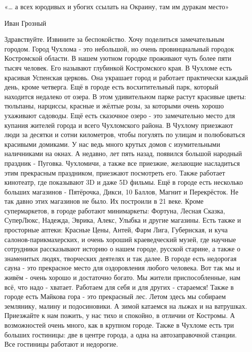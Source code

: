 \begin{itemize}
«… а всех юродивых и убогих ссылать на Окраину, там им дуракам место»

Иван Грозный


Здравствуйте. Извините за беспокойство. Хочу поделиться замечательным городом.
Город Чухлома - это небольшой, но очень провинциальный городок Костромской
области. В нашем уютном городке проживают чуть более пяти тысяч человек. Его
называют глубинкой Костромского края. В Чухломе есть красивая Успенская
церковь. Она украшает город и работает практически каждый день, кроме четверга.
Ещё в городе есть восхитительный парк, который находится недалеко от озера. В
этом удивительном парке растут красивые цветы: тюльпаны, нарциссы, красные и
жёлтые розы, за которыми очень хорошо ухаживают садоводы. Ещё есть сказочное
озеро - это замечательно место для купания жителей города и всего Чухломского
района. В Чухлому приезжают люди за десятки и сотни километров, чтобы погулять
по улицам и полюбоваться красивыми домиками. У нас ведь много крутых домов с
изумительными наличниками на окнах. А недавно, лет пять назад, появился большой
народный праздник - Пуговка. Чухломичи, а также все приезжие, желающие
насладиться этим прекрасным праздником, приезжают посмотреть его. Также
работает кинотеатр, где показывают 3D и даже 5D фильмы. Ещё в городе есть
несколько больших магазинов - Пятёрочка, Дикси, 10 Баллов, Магнит и
Перекрёсток. Не так давно этих магазинов не было. Их построили в 21 веке. Кроме
супермаркетов, в городе работают минимаркеты: Фортуна, Лесная Сказка,
СуперЛюкс, Надежда, Эврика, Алекс, Улыбка и другие магазины. Есть также и
просторные аптеки: Красные Цены, Антей, Фарм Лига, Губернская, и куча
салонов-парикмахерских, и очень хороший краеведческий музей, где научные
сотрудники рассказывают историю о нашем городе, русской старине, а также о
знаменитых людях, творческих деятелях и так далее. В городе есть недорогая
сауна - это прекрасное место для оздоровления любого человека. Вот так мы и
живём - очень хорошо и достаточно богато. Мы жители приспособленные, нам всё,
что надо - хватает. Работаем для себя и для других - стараемся! Также в городе
есть Майкова гора - это прекрасный лес. Летом здесь мы собираем землянику,
малину и подосиновики. А зимой катаемся на лыжах и на ватрушках. Приезжайте к
нам пожить, у нас тихо и спокойно, в отличии от Костромы. А возможностей очень
много, как в крупном городе. Также в Чухломе есть три больших гостиницы: две в
центре города, а одна на автозаправочной станции. Все гостиницы работают и
недорогие.


\end{itemize}
